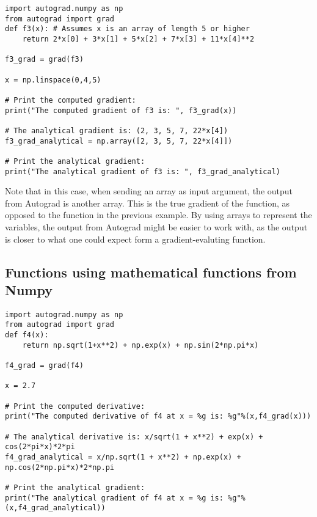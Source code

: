 \documentclass[%
oneside,                 %
final,                   %
10pt]{article}
\begin{document}
\begin{verbatim}
import autograd.numpy as np
from autograd import grad
def f3(x): # Assumes x is an array of length 5 or higher
    return 2*x[0] + 3*x[1] + 5*x[2] + 7*x[3] + 11*x[4]**2

f3_grad = grad(f3)

x = np.linspace(0,4,5)

# Print the computed gradient:
print("The computed gradient of f3 is: ", f3_grad(x))

# The analytical gradient is: (2, 3, 5, 7, 22*x[4])
f3_grad_analytical = np.array([2, 3, 5, 7, 22*x[4]])

# Print the analytical gradient:
print("The analytical gradient of f3 is: ", f3_grad_analytical)
\end{verbatim}

Note that in this case, when sending an array as input argument, the
output from Autograd is another array. This is the true gradient of
the function, as opposed to the function in the previous example. By
using arrays to represent the variables, the output from Autograd
might be easier to work with, as the output is closer to what one
could expect form a gradient-evaluting function.

\subsection*{Functions using mathematical functions from Numpy}

\begin{verbatim}
import autograd.numpy as np
from autograd import grad
def f4(x):
    return np.sqrt(1+x**2) + np.exp(x) + np.sin(2*np.pi*x)

f4_grad = grad(f4)

x = 2.7

# Print the computed derivative:
print("The computed derivative of f4 at x = %g is: %g"%(x,f4_grad(x)))

# The analytical derivative is: x/sqrt(1 + x**2) + exp(x) + cos(2*pi*x)*2*pi
f4_grad_analytical = x/np.sqrt(1 + x**2) + np.exp(x) + np.cos(2*np.pi*x)*2*np.pi

# Print the analytical gradient:
print("The analytical gradient of f4 at x = %g is: %g"%(x,f4_grad_analytical))
\end{verbatim}
\end{document}
